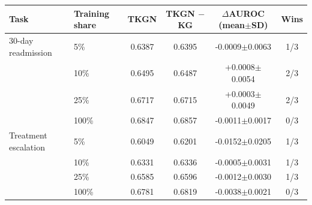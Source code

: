 \begin{tabular}{@{}llcccc@{}}
\toprule
Task & Training share & TKGN & TKGN $-$ KG & $\Delta$AUROC (mean$\pm$SD) & Wins \\
\midrule
30-day readmission & 5\% & 0.6387 & 0.6395 & -0.0009$\pm$0.0063 & 1/3 \\
 & 10\% & 0.6495 & 0.6487 & +0.0008$\pm$0.0054 & 2/3 \\
 & 25\% & 0.6717 & 0.6715 & +0.0003$\pm$0.0049 & 2/3 \\
 & 100\% & 0.6847 & 0.6857 & -0.0011$\pm$0.0017 & 0/3 \\
\midrule
Treatment escalation & 5\% & 0.6049 & 0.6201 & -0.0152$\pm$0.0205 & 1/3 \\
 & 10\% & 0.6331 & 0.6336 & -0.0005$\pm$0.0031 & 1/3 \\
 & 25\% & 0.6585 & 0.6596 & -0.0012$\pm$0.0030 & 1/3 \\
 & 100\% & 0.6781 & 0.6819 & -0.0038$\pm$0.0021 & 0/3 \\
\bottomrule
\end{tabular}

